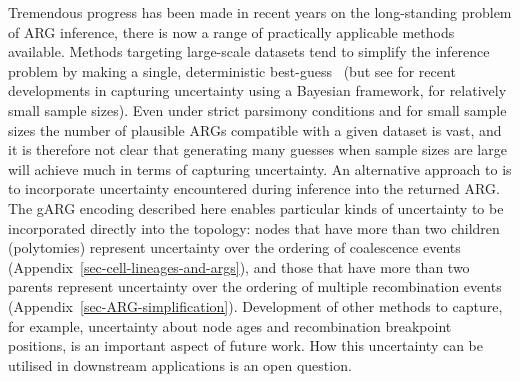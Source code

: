 \documentclass[9pt,twocolumn,twoside]{gsajnl}
\newcommand{\relate}[0]{\texttt{Relate}}
\begin{document}
Tremendous progress has been made in recent years on the long-standing
problem of ARG inference, there is now a range of practically 
applicable methods available.
Methods targeting large-scale datasets tend to simplify
the inference problem by
making a single, deterministic 
best-guess~\citep{kelleher2019inferring,speidel2019method,zhang2023biobank,zhan2023towards} 
(but see \citep{deng2024robust} for recent
developments in capturing uncertainty using a Bayesian framework, for relatively small
sample sizes).
Even under strict parsimony conditions and for small sample sizes the
number of plausible ARGs compatible with a given dataset is vast,
and it is therefore not clear that generating many guesses
when sample sizes are large will achieve much in terms of capturing uncertainty.
An alternative approach to 
is to incorporate uncertainty encountered during inference into the returned ARG.
The gARG encoding described here enables particular kinds of uncertainty
to be incorporated directly into the topology:
nodes that have more than two children (polytomies)
represent uncertainty over the ordering of coalescence events 
(Appendix~\ref{sec-cell-lineages-and-args}), 
and those that have more than two parents 
represent uncertainty over the ordering of multiple recombination events
(Appendix~\ref{sec-ARG-simplification}). 
Development of other methods to capture, for example,
uncertainty about node ages and recombination breakpoint positions, is an important
aspect of future work.
How this uncertainty can be utilised in downstream applications
is an open question.

\end{document}
